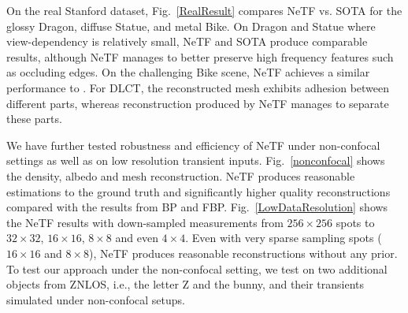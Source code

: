 \documentclass[10pt,journal,compsoc]{IEEEtran}
\begin{document}
On the real Stanford dataset, Fig.~\ref{RealResult} compares NeTF vs. SOTA for the glossy Dragon, diffuse Statue, and metal Bike. On Dragon and Statue where view-dependency is relatively small, NeTF and SOTA produce comparable results, although NeTF manages to better preserve high frequency features such as occluding edges. On the challenging Bike scene, NeTF achieves a similar performance to \cite{2019Liu}. For DLCT, the reconstructed mesh exhibits adhesion between different parts, whereas reconstruction produced by NeTF manages to separate these parts.


We have further tested robustness and efficiency of NeTF under non-confocal settings as well as on low resolution transient inputs. Fig.~\ref{nonconfocal} shows the density, albedo and mesh reconstruction. NeTF produces reasonable estimations to the ground truth and significantly higher quality reconstructions compared with the results from BP 
and FBP\cite{2012Velten}. Fig.~\ref{LowDataResolution} shows the NeTF results with down-sampled measurements from $256\times256$ spots to $32\times32$, $16\times16$, $8\times8$ and even $4\times4$. Even with very sparse sampling spots ($16\times16$ and $8\times8$), NeTF produces reasonable reconstructions without any prior. To test our approach under the non-confocal setting, we test on two additional objects from ZNLOS, i.e., the letter Z and the bunny, and their transients simulated under non-confocal setups.
\end{document}
